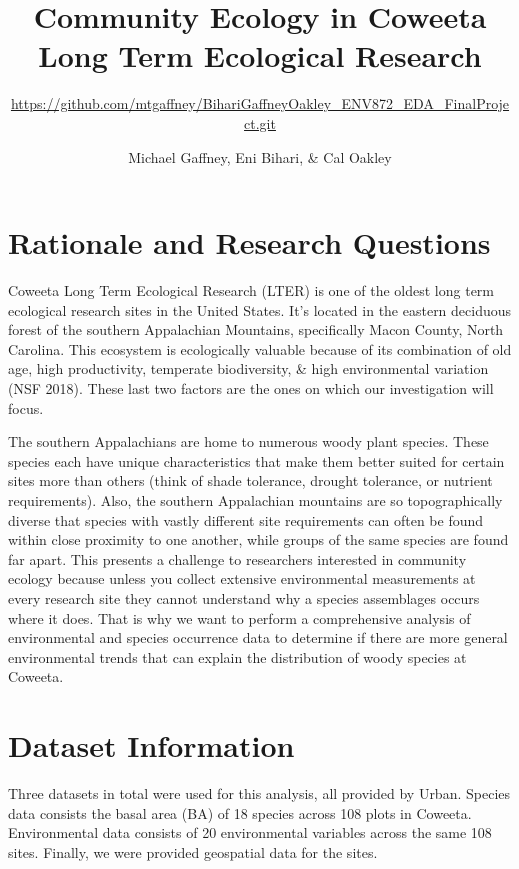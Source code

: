 \documentclass[
  12pt,
]{article}
\title{Community Ecology in Coweeta Long Term Ecological Research}
\subtitle{\url{https://github.com/mtgaffney/BihariGaffneyOakley_ENV872_EDA_FinalProject.git}}
\author{Michael Gaffney, Eni Bihari, \& Cal Oakley}
\date{}
\begin{document}
\maketitle

\newpage
\tableofcontents 
\newpage
\listoftables 
\newpage
\listoffigures 
\newpage

\hypertarget{rationale-and-research-questions}{%
\section{Rationale and Research
Questions}\label{rationale-and-research-questions}}

Coweeta Long Term Ecological Research (LTER) is one of the oldest long
term ecological research sites in the United States. It's located in the
eastern deciduous forest of the southern Appalachian Mountains,
specifically Macon County, North Carolina. This ecosystem is
ecologically valuable because of its combination of old age, high
productivity, temperate biodiversity, \& high environmental variation
(NSF 2018). These last two factors are the ones on which our
investigation will focus.

The southern Appalachians are home to numerous woody plant species.
These species each have unique characteristics that make them better
suited for certain sites more than others (think of shade tolerance,
drought tolerance, or nutrient requirements). Also, the southern
Appalachian mountains are so topographically diverse that species with
vastly different site requirements can often be found within close
proximity to one another, while groups of the same species are found far
apart. This presents a challenge to researchers interested in community
ecology because unless you collect extensive environmental measurements
at every research site they cannot understand why a species assemblages
occurs where it does. That is why we want to perform a comprehensive
analysis of environmental and species occurrence data to determine if
there are more general environmental trends that can explain the
distribution of woody species at Coweeta.

\newpage

\hypertarget{dataset-information}{%
\section{Dataset Information}\label{dataset-information}}

Three datasets in total were used for this analysis, all provided by
Urban. Species data consists the basal area (BA) of 18 species across
108 plots in Coweeta. Environmental data consists of 20 environmental
variables across the same 108 sites. Finally, we were provided
geospatial data for the sites.
\end{document}
